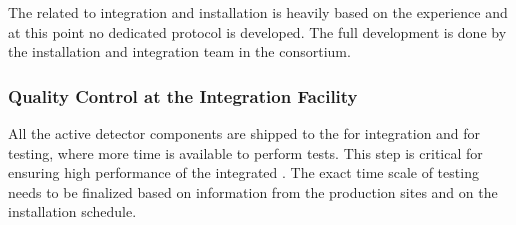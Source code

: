 The  related to integration and installation is heavily based on the  experience and at this point no dedicated  protocol is developed. The full development is done by the installation and integration team in the  consortium. 

\subsubsection{Quality Control at the Integration Facility}
\label{sec:fdsp-apa-install-qc_if}

All the active detector components are shipped to the  for integration and for testing, where more time is available %
to perform tests. This step is critical for ensuring high performance of the integrated . The exact time scale of  testing needs to be finalized based on information from the production sites and on the installation schedule. 



\begin{comment}
\begin{dunetable}[QC List]{l|c|c}{tab:qclist}{List of tests performed for Quality Control upon reception at the integration facility}   
Test to perform   &  Number of wires/channels & Acceptable values, action\\ 
Visual inspection & All & > 99\% intact \\
Wire tension      & 10$\%$ sample & 5 $\pm$ \SI{1}{N}\\
Wire continuity   & All & $-$\\
Current leakage   & All & < X $\mu$A \\
Electronics connections & All & Perfect (> 99$\%$)\\
Cold test         & All & All intact (> 99$\%$)\\
\textbf{Overall}  & \textbf{All} & \textbf{At least 99$\%$ fully operational}\\
\end{dunetable}
\end{comment}

